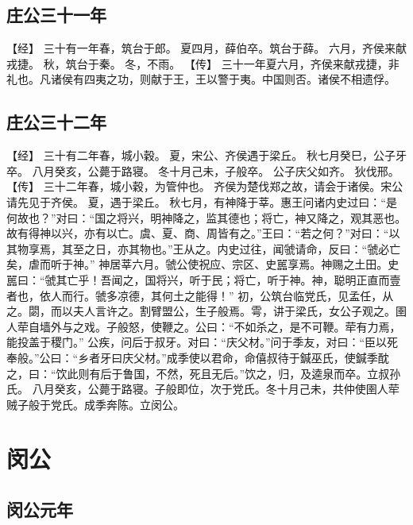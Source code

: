 \documentclass[a4paper,12pt,UTF8,twoside]{ctexbook}
\begin{document}
\chapter{庄公三十一年}

【经】
三十有一年春，筑台于郎。
夏四月，薛伯卒。筑台于薛。
六月，齐侯来献戎捷。
秋，筑台于秦。
冬，不雨。
【传】
三十一年夏六月，齐侯来献戎捷，非礼也。凡诸侯有四夷之功，则献于王，王以警于夷。中国则否。诸侯不相遗俘。

\chapter{庄公三十二年}

【经】
三十有二年春，城小穀。
夏，宋公、齐侯遇于梁丘。
秋七月癸巳，公子牙卒。
八月癸亥，公薨于路寝。
冬十月己未，子般卒。
公子庆父如齐。
狄伐邢。
【传】
三十二年春，城小穀，为管仲也。
齐侯为楚伐郑之故，请会于诸侯。宋公请先见于齐侯。
夏，遇于梁丘。
秋七月，有神降于莘。惠王问诸内史过曰：“是何故也？”对曰：“国之将兴，明神降之，监其德也；将亡，神又降之，观其恶也。故有得神以兴，亦有以亡。虞、夏、商、周皆有之。”王曰：“若之何？”对曰：“以其物享焉，其至之日，亦其物也。”王从之。内史过往，闻虢请命，反曰：“虢必亡矣，虐而听于神。”
神居莘六月。虢公使祝应、宗区、史嚚享焉。神赐之土田。史嚚曰：“虢其亡乎！吾闻之，国将兴，听于民；将亡，听于神。神，聪明正直而壹者也，依人而行。虢多凉德，其何土之能得！”
初，公筑台临党氏，见孟任，从之。閟，而以夫人言许之。割臂盟公，生子般焉。雩，讲于梁氏，女公子观之。圉人荦自墙外与之戏。子般怒，使鞭之。公曰：“不如杀之，是不可鞭。荦有力焉，能投盖于稷门。”
公疾，问后于叔牙。对曰：“庆父材。”问于季友，对曰：“臣以死奉般。”公曰：“乡者牙曰庆父材。”成季使以君命，命僖叔待于鍼巫氏，使鍼季酖之，曰：“饮此则有后于鲁国，不然，死且无后。”饮之，归，及逵泉而卒。立叔孙氏。
八月癸亥，公薨于路寝。子般即位，次于党氏。冬十月己未，共仲使圉人荦贼子般于党氏。成季奔陈。立闵公。

\part{闵公}

\chapter{闵公元年}
\end{document}
